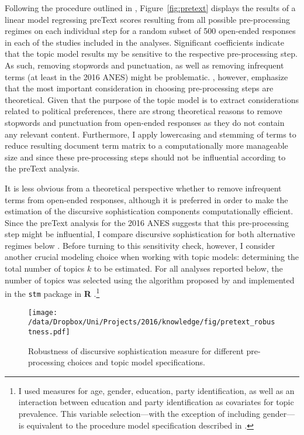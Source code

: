 Following the procedure outlined in \citet{denny2018text}, Figure~\ref{fig:pretext} displays the results of a linear model regressing preText scores resulting from all possible pre-processing regimes on each individual step for a random subset of 500 open-ended responses in each of the studies included in the analyses. Significant coefficients indicate that the topic model results my be sensitive to the respective pre-processing step. As such, removing stopwords and punctuation, as well as removing infrequent terms (at least in the 2016 ANES) might be problematic. \citet{denny2018text}, however, emphasize that the most important consideration in choosing pre-processing steps are theoretical. Given that the purpose of the topic model is to extract considerations related to political preferences, there are strong theoretical reasons to remove stopwords and punctuation from open-ended responses as they do not contain any relevant content. Furthermore, I apply lowercasing and stemming of terms to reduce resulting document term matrix to a computationally more manageable size and since these pre-processing steps should not be influential according to the preText analysis.

It is less obvious from a theoretical perspective whether to remove infrequent terms from open-ended responses, although it is preferred in order to make the estimation of the discursive sophistication components computationally efficient. Since the preText analysis for the 2016 ANES suggests that this pre-processing step might be influential, I compare discursive sophistication for both alternative regimes below \citep[c.f.,][]{denny2018text}. Before turning to this sensitivity check, however, I consider another crucial modeling choice when working with topic models: determining the total number of topics $k$ to be estimated. For all analyses reported below, the number of topics was selected using the algorithm proposed by \citet{lee2014low} and implemented in the \texttt{stm} package in \textbf{R} \citep{roberts2014stm}.\footnote{I used measures for age, gender, education, party identification, as well as an interaction between education and party identification as covariates for topic prevalence. This variable selection---with the exception of including gender---is equivalent to the procedure model specification described in \citet{roberts2014structural}.} 

\begin{figure}[h]\centering
\texttt{[image: /data/Dropbox/Uni/Projects/2016/knowledge/fig/pretext\_robustness.pdf]}
\caption[Robustness of discursive sophistication measure for different pre-processing choices and topic model specifications]{Robustness of discursive sophistication measure for different pre-processing choices and topic model specifications.}\label{fig:pretext_robustness}
\end{figure}

